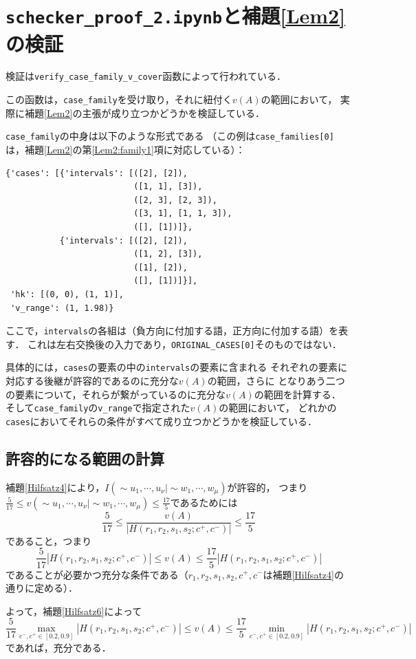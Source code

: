 \documentclass[10pt,a4paper]{ujarticle}
\theoremstyle{definition}
\begin{document}
\section{\texttt{schecker\_proof\_2.ipynb}と補題\ref{Lem2}の検証}

検証は\verb|verify_case_family_v_cover|函数によって行われている．

この函数は，\verb|case_family|を受け取り，それに紐付く$v(A)$の範囲において，
実際に補題\ref{Lem2}の主張が成り立つかどうかを検証している．

\verb|case_family|の中身は以下のような形式である
（この例は\verb|case_families[0]|は，補題\ref{Lem2}の第\ref{Lem2:family1}項に対応している）：
\begin{lstlisting}
{'cases': [{'intervals': [([2], [2]),
                          ([1, 1], [3]),
                          ([2, 3], [2, 3]),
                          ([3, 1], [1, 1, 3]),
                          ([], [1])]},
           {'intervals': [([2], [2]),
                          ([1, 2], [3]),
                          ([1], [2]),
                          ([], [1])]}],
 'hk': [(0, 0), (1, 1)],
 'v_range': (1, 1.98)}
\end{lstlisting}
ここで，\verb|intervals|の各組は（負方向に付加する語，正方向に付加する語）を表す．
これは左右交換後の入力であり，\verb|ORIGINAL_CASES[0]|そのものではない．

具体的には，\verb|cases|の要素の中の\verb|intervals|の要素に含まれる
それぞれの要素に対応する後継が許容的であるのに充分な$v(A)$の範囲，さらに
となりあう二つの要素について，それらが繋がっているのに充分な$v(A)$の範囲を計算する．
そして\verb|case_family|の\verb|v_range|で指定された$v(A)$の範囲において，
どれかの\verb|cases|においてそれらの条件がすべて成り立つかどうかを検証している．


\subsection{許容的になる範囲の計算}
補題\ref{Hilfsatz4}により，$I(\sim u_1,\cdots, u_\nu | \sim w_1,\cdots, w_\mu)$が許容的，
つまり$\frac{5}{17} \le v(\sim u_1,\cdots, u_\nu | \sim w_1,\cdots, w_\mu)\le \frac{17}{5}$であるためには
\[
\frac{5}{17}\le \frac{v(A)}{|H(r_1,r_2,s_1,s_2; c^+, c^-)|}\le \frac{17}{5}
\]
であること，つまり
\[
\frac{5}{17}|H(r_1,r_2,s_1,s_2; c^+, c^-)|\le v(A) \le \frac{17}{5}|H(r_1,r_2,s_1,s_2; c^+, c^-)|
\]
であることが必要かつ充分な条件である（$r_1,r_2,s_1,s_2, c^+, c^-$は補題\ref{Hilfsatz4}の通りに定める）．

よって，補題\ref{Hilfsatz6}によって
\[
  \frac{5}{17}\max_{c^-, c^+ \in [0.2,0.9]}|H(r_1,r_2,s_1,s_2; c^+, c^-)|
  \le v(A)
  \le \frac{17}{5} \min_{c^-, c^+ \in [0.2,0.9]} |H(r_1,r_2,s_1,s_2; c^+, c^-)|
\]
であれば，充分である．
\end{document}
